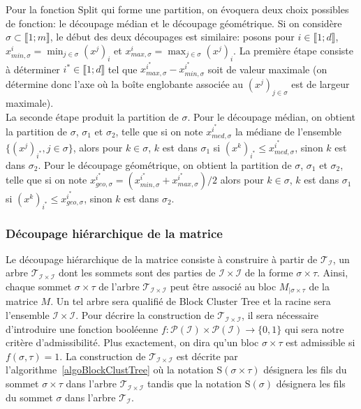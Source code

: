 Pour la fonction \og $\mathrm{Split}$ \fg{} qui forme une partition, on évoquera deux choix possibles de fonction: le découpage
médian et le découpage géométrique. Si on considère $\sigma \subset \llbracket 1;m \rrbracket$, le début
des deux découpages est similaire: posons pour $i \in \llbracket 1;d \rrbracket$,
$x_{min,\sigma}^{i} = \min_{j \in \sigma} (x^j)_i $ et $x_{max,\sigma}^{i} = \max_{j \in \sigma} (x^j)_i $.
La première étape consiste à déterminer $i^{*} \in \llbracket 1;d \rrbracket$ tel que
$x_{max,\sigma}^{i^{*}} - x_{min,\sigma}^{i^{*}}$ soit de valeur maximale (on détermine donc l'axe où la boîte englobante
associée au $(x^j)_{j \in \sigma}$ est de largeur maximale).\\
La seconde étape produit la partition de
$\sigma$. Pour le découpage médian, on obtient la partition de $\sigma$, $\sigma_1$ et $\sigma_2$,
telle que si on note $x_{med,\sigma}^{i^{*}}$ la médiane de l'ensemble $\{(x^j)_{i^{*}}, j \in \sigma \}$, alors
pour $k \in \sigma$, $k$ est dans $\sigma_1$ si $(x^k)_{i^{*}} \leq x_{med,\sigma}^{i^{*}}$, sinon $k$ est dans $\sigma_2$.
Pour le découpage géométrique, on obtient la partition de $\sigma$, $\sigma_1$ et $\sigma_2$,
telle que si on note $x_{geo,\sigma}^{i^{*}} = (x_{min,\sigma}^{i^{*}} + x_{max,\sigma}^{i^{*}})/2$ alors
pour $k \in \sigma$, $k$ est dans $\sigma_1$ si $(x^k)_{i^{*}} \leq x_{geo,\sigma}^{i^{*}}$, sinon $k$ est dans $\sigma_2$.

\subsubsection{Découpage hiérarchique de la matrice}
\label{decoupHieMat}
Le découpage hiérarchique de la matrice consiste à construire à partir de $\mathcal{T}_{\mathcal{I}}$, un arbre
$\mathcal{T}_{\mathcal{I} \times \mathcal{I}}$ dont les sommets sont des parties de $\mathcal{I} \times \mathcal{I}$ de la forme $\sigma \times \tau$.
Ainsi, chaque sommet $\sigma \times \tau$ de l'arbre $\mathcal{T}_{\mathcal{I} \times \mathcal{I}}$ peut être associé au bloc $M_{|\sigma \times \tau}$
de la matrice $M$. Un tel arbre sera qualifié de Block Cluster Tree et la racine sera l'ensemble $\mathcal{I} \times \mathcal{I}$.
Pour décrire la construction de $\mathcal{T}_{\mathcal{I} \times \mathcal{I}}$,
il sera nécessaire d'introduire une fonction booléenne $f: \mathcal{P}(\mathcal{I}) \times \mathcal{P}(\mathcal{I}) \rightarrow \{0,1\}$
qui sera notre critère d'admissibilité. Plus exactement, on dira qu'un bloc $\sigma \times \tau$ est admissible si $f(\sigma,\tau) = 1$.
La construction de $\mathcal{T}_{\mathcal{I} \times \mathcal{I}}$ est décrite par l'algorithme~\ref{algoBlockClustTree} où la notation $\mathrm{S}(\sigma \times \tau)$
désignera les fils du sommet $\sigma \times \tau$ dans l'arbre $\mathcal{T}_{\mathcal{I} \times \mathcal{I}}$ tandis que la notation $\mathrm{S}(\sigma)$
désignera les fils du sommet $\sigma$ dans l'arbre $\mathcal{T}_{\mathcal{I}}$.

